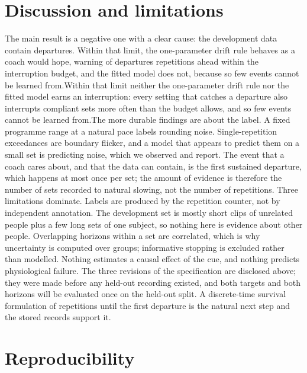 \documentclass[11pt,a4paper]{article}
\begin{document}
\section{Discussion and limitations}

The main result is a negative one with a clear cause: the development data contain \EventsDev{} departures. \ifdefined\DriftRuleFound Within that limit, the one-parameter drift rule behaves as a coach would hope, warning \RecallDrift{} of departures \LeadDriftReps{} repetitions ahead within the interruption budget, and the fitted model does not, because so few events cannot be learned from.\else Within that limit neither the one-parameter drift rule nor the fitted model earns an interruption: every setting that catches a departure also interrupts compliant sets more often than the budget allows, and so few events cannot be learned from.\fi The more durable findings are about the label. A fixed programme range at a natural pace labels rounding noise. Single-repetition exceedances are boundary flicker, and a model that appears to predict them on a small set is predicting noise, which we observed and report. The event that a coach cares about, and that the data can contain, is the first sustained departure, which happens at most once per set; the amount of evidence is therefore the number of sets recorded to natural slowing, not the number of repetitions. Three limitations dominate. Labels are produced by the repetition counter, not by independent annotation. The development set is mostly short clips of unrelated people plus a few long sets of one subject, so nothing here is evidence about other people. Overlapping horizons within a set are correlated, which is why uncertainty is computed over groups; informative stopping is excluded rather than modelled. Nothing estimates a causal effect of the cue, and nothing predicts physiological failure. The three revisions of the specification are disclosed above; they were made before any held-out recording existed, and both targets and both horizons will be evaluated once on the held-out split. A discrete-time survival formulation of repetitions until the first departure is the natural next step and the stored records support it.

\section{Reproducibility}
\end{document}
